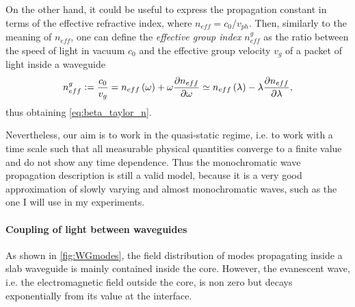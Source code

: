 On the other hand, it could be useful to express the propagation constant in terms of the effective refractive index, where $n_{eff} = c_0/v_{ph}$.
Then, similarly to the meaning of $n_{eff}$, one can define the \textit{effective group index} $n_{eff}^g$ as the ratio between the speed of light in vacuum $c_0$ and the effective group velocity $v_g$ of a packet of light inside a waveguide
\begin{equation}
	n_{eff}^g \vcentcolon= \dfrac{c_0}{v_g} = n_{eff}\left( \omega \right) +\omega\dfrac{\partial n_{eff}}{\partial \omega}
	\simeq n_{eff}\left( \lambda \right) -\lambda\dfrac{\partial n_{eff}}{\partial \lambda},
	\label{eq:neff_group}
\end{equation}
thus obtaining \autoref{eq:beta_taylor_n}.


Nevertheless, our aim is to work in the quasi-static regime, i.e. to work with a time scale such that all measurable physical quantities converge to a finite value and do not show any time dependence.
Thus the monochromatic wave propagation description is still a valid model, because it is a very good approximation of slowly varying and almost monochromatic waves, such as the one I will use in my experiments.

\paragraph{Coupling of light between waveguides\\}
\label{par:light_coupling}
As shown in \autoref{fig:WGmodes}, the field distribution of modes propagating inside a slab waveguide is mainly contained inside the core.
However, the evanescent wave, i.e. the electromagnetic field outside the core, is non zero but decays exponentially from its value at the interface.

